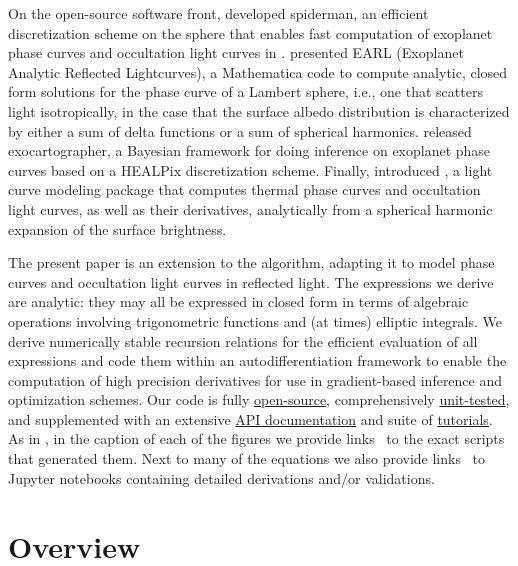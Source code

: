 \documentclass[modern]{aastex62}
\begin{document}
On the open-source software front, \citet{Louden2018} developed
\textsf{spiderman}, an efficient discretization scheme
on the sphere that enables fast computation of exoplanet
phase curves and occultation light curves in \Python.
%
\citet{Haggard2018} presented
\textsf{EARL} (Exoplanet Analytic Reflected Lightcurves),
a \textsf{Mathematica} code to compute analytic, closed form
solutions for the phase curve of a Lambert sphere, i.e., one that
scatters light isotropically, in the case that the surface albedo
distribution is characterized by either a sum of delta functions
or a sum of spherical harmonics.
%
\citet{Farr2018} released \textsf{exocartographer}, a Bayesian
framework for doing inference on exoplanet phase curves based on
a HEALPix \citep{healpix} discretization scheme.
%
Finally, \citet{Luger2019} introduced \starry, a light curve
modeling package that computes thermal phase curves and occultation
light curves, as well as their derivatives, analytically from a spherical
harmonic expansion of the surface brightness.

The present paper is an extension to the \starry algorithm,
adapting it to model phase curves and occultation light curves
in reflected light. The expressions
we derive are analytic: they may all be expressed in closed form
in terms of algebraic operations involving trigonometric functions
and (at times) elliptic integrals. We derive numerically
stable recursion relations for the efficient evaluation of all
expressions and code them within an autodifferentiation framework
to enable the computation of high precision derivatives for use in
gradient-based inference and optimization schemes.
Our code is fully
\href{https://github.com/rodluger/starry}{open-source},
comprehensively
\href{https://dev.azure.com/rodluger/starry/_test/analytics?definitionId=4}{unit-tested},
and supplemented with an extensive
\href{https://rodluger.github.io/starry}{API documentation}
and suite of
\href{https://rodluger.github.io/starry/latest/tutorials.html}{tutorials}.
%
As in \citet{Luger2019}, in the caption of each of the figures
we provide links \codeicon\ to the exact \Python scripts that
generated them. Next to many of the equations we also provide
links \prooficon\ to \textsf{Jupyter} notebooks containing
detailed derivations and/or validations.

\section{Overview}
\label{sec:overview}
\end{document}
